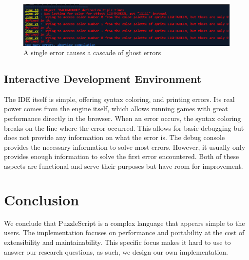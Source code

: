 \begin{figure}[!t]
    \centering
    \includegraphics[width=1\textwidth]{images/Example_errors_current.png}
    \caption{A single error causes a cascade of ghost errors}
    \label{fig:error_cascade}
\end{figure}

\subsection{Interactive Development Environment}
The IDE itself is simple, offering syntax coloring, and printing errors. Its real power comes from the engine itself, which allows running games with great performance directly in the browser. When an error occurs, the syntax coloring breaks on the line where the error occurred. This allows for basic debugging but does not provide any information on what the error is. The debug console provides the necessary information to solve most errors. However, it usually only provides enough information to solve the first error encountered. Both of these aspects are functional and serve their purposes but have room for improvement.

\section{Conclusion}
We conclude that PuzzleScript is a complex language that appears simple to the users. The implementation focuses on performance and portability at the cost of extensibility and maintainability. This specific focus makes it hard to use to answer our research questions, as such, we design our own implementation.
